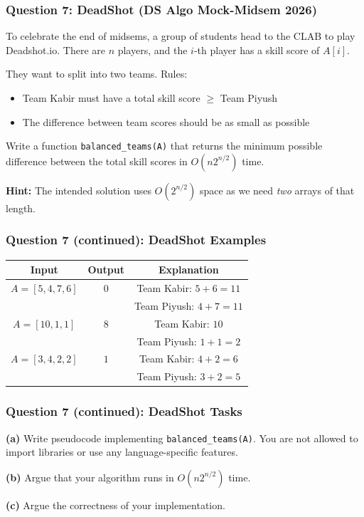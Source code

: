 \documentclass{beamer}
\begin{document}
\begin{frame}[fragile]
\frametitle{Question 7: DeadShot (DS Algo Mock-Midsem 2026)}

To celebrate the end of midsems, a group of students head to the CLAB to play Deadshot.io. There are $n$ players, and the $i$-th player has a skill score of $A[i]$.

They want to split into two teams. Rules:
\begin{itemize}
\item Team Kabir must have a total skill score $\ge$ Team Piyush
\item The difference between team scores should be as small as possible
\end{itemize}

Write a function \texttt{balanced\_teams(A)} that returns the minimum possible difference between the total skill scores in $O(n 2^{n/2})$ time.

\vspace{0.3cm}

\textbf{Hint:} The intended solution uses $O(2^{n/2})$ space as we need \textit{two} arrays of that length.

\end{frame}

\begin{frame}
\frametitle{Question 7 (continued): DeadShot Examples}

\begin{tabular}{|c|c|c|}
\hline
\textbf{Input} & \textbf{Output} & \textbf{Explanation} \\
\hline
$A = [5,4,7,6]$ & $0$ & Team Kabir: $5+6=11$ \\
 &  & Team Piyush: $4+7=11$ \\
\hline
$A = [10,1,1]$ & $8$ & Team Kabir: $10$ \\
 &  & Team Piyush: $1+1=2$ \\
\hline
$A = [3,4,2,2]$ & $1$ & Team Kabir: $4+2=6$ \\
 &  & Team Piyush: $3+2=5$ \\
\hline
\end{tabular}

\end{frame}

\begin{frame}[fragile]
\frametitle{Question 7 (continued): DeadShot Tasks}

\textbf{(a)} Write pseudocode implementing \texttt{balanced\_teams(A)}. You are not allowed to import libraries or use any language-specific features.

\vspace{0.4cm}

\textbf{(b)} Argue that your algorithm runs in $O(n 2^{n/2})$ time.

\vspace{0.4cm}

\textbf{(c)} Argue the correctness of your implementation.

\end{frame}

\begin{frame}
\end{frame}

\begin{frame}
\end{frame}
\end{document}
